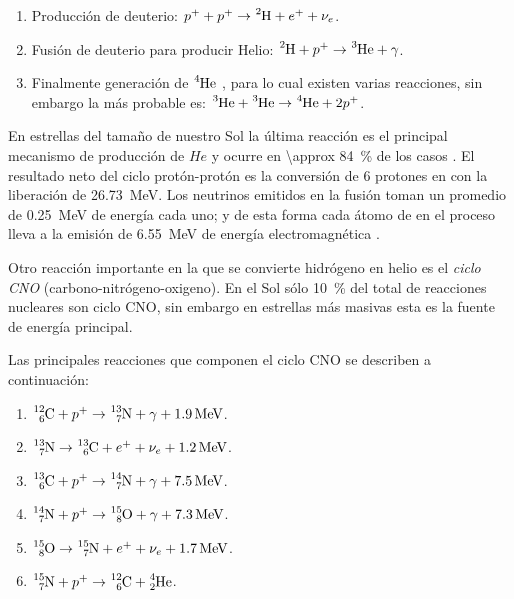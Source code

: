 \begin{enumerate}
  \item Producción de deuterio: $p^{+}+p^{+}\rightarrow\ce{^{2}H}+e^{+}+\nu_{e}$.
  \item Fusión de deuterio para producir Helio: $\ce{^{2}H}+p^{+}\rightarrow\ce{^{3}He}+\gamma$.
  \item Finalmente generación de $\ce{^{4}He}$ , para lo cual existen varias reacciones, sin embargo la más probable es: $\ce{^{3}He}+\ce{^{3}He}\rightarrow\ce{^{4}He}+2p^{+}$.
\end{enumerate}

En estrellas del tamaño de nuestro Sol la última reacción es el principal mecanismo de producción de $He$ y ocurre en \SI{\approx 84}{\percent} de los casos \cite{adelberger11}. El resultado neto del ciclo protón-protón es la conversión de \num{6} protones en  con la liberación de \SI{26.73}{\mega\electronvolt}. Los neutrinos emitidos en la fusión toman un promedio de \SI{0.25}{\mega\electronvolt} de energía cada uno; y de esta forma cada átomo de  en el proceso lleva a la emisión de \SI{6.55}{\mega\electronvolt} de energía electromagnética \cite{noyes82}.

Otro reacción importante en la que se convierte hidrógeno en helio es el \emph{ciclo CNO} (carbono-nitrógeno-oxigeno). En el Sol sólo \SI{10}{\percent} del total de reacciones nucleares son ciclo CNO, sin embargo en estrellas más masivas esta es la fuente de energía principal.

Las principales reacciones que componen el ciclo CNO se describen a continuación:

\begin{enumerate}
	\item $\ce{_{6}^{12}C}+p^{+}\rightarrow\ce{_{7}^{13}N}+\gamma+\SI{1.9}{\mega\electronvolt}$.
	\item $\ce{_{7}^{13}N}\rightarrow\ce{_{6}^{13}C}+e^{+}+\nu_{e}+\SI{1.2}{\mega\electronvolt}$.
	\item $\ce{_{6}^{13}C}+p^{+}\rightarrow\ce{_{7}^{14}N}+\gamma+\SI{7.5}{\mega\electronvolt}$.
	\item $\ce{_{7}^{14}N}+p^{+}\rightarrow\ce{_{8}^{15}O}+\gamma+\SI{7.3}{\mega\electronvolt}$.
	\item $\ce{_{8}^{15}O}\rightarrow\ce{_{7}^{15}N}+e^{+}+\nu_{e}+\SI{1.7}{\mega\electronvolt}$.
	\item $\ce{_{7}^{15}N}+p^{+}\rightarrow\ce{_{6}^{12}C}+\ce{_{2}^{4}He}$.
\end{enumerate}

